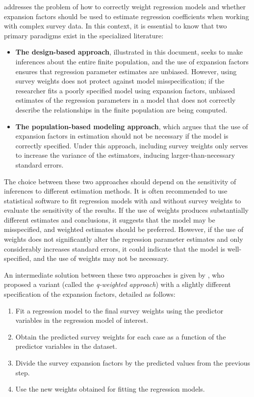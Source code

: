 \documentclass[
  12pt,
]{book}
\providecommand{\tightlist}{%
  \setlength{\itemsep}{0pt}\setlength{\parskip}{0pt}}
\begin{document}
\citet{Heeringa_West_Berglund_2017} addresses the problem of how to correctly weight regression models and whether expansion factors should be used to estimate regression coefficients when working with complex survey data. In this context, it is essential to know that two primary paradigms exist in the specialized literature:

\begin{itemize}
\tightlist
\item
  \textbf{The design-based approach}, illustrated in this document, seeks to make inferences about the entire finite population, and the use of expansion factors ensures that regression parameter estimates are unbiased. However, using survey weights does not protect against model misspecification; if the researcher fits a poorly specified model using expansion factors, unbiased estimates of the regression parameters in a model that does not correctly describe the relationships in the finite population are being computed.
\item
  \textbf{The population-based modeling approach}, which argues that the use of expansion factors in estimation should not be necessary if the model is correctly specified. Under this approach, including survey weights only serves to increase the variance of the estimators, inducing larger-than-necessary standard errors.
\end{itemize}

The choice between these two approaches should depend on the sensitivity of inferences to different estimation methods. It is often recommended to use statistical software to fit regression models with and without survey weights to evaluate the sensitivity of the results. If the use of weights produces substantially different estimates and conclusions, it suggests that the model may be misspecified, and weighted estimates should be preferred. However, if the use of weights does not significantly alter the regression parameter estimates and only considerably increases standard errors, it could indicate that the model is well-specified, and the use of weights may not be necessary.

An intermediate solution between these two approaches is given by \citet{pfeffermann2011modelling}, who proposed a variant (called the \emph{q-weighted approach}) with a slightly different specification of the expansion factors, detailed as follows:

\begin{enumerate}
\def\labelenumi{\arabic{enumi}.}
\tightlist
\item
  Fit a regression model to the final survey weights using the predictor variables in the regression model of interest.
\item
  Obtain the predicted survey weights for each case as a function of the predictor variables in the dataset.
\item
  Divide the survey expansion factors by the predicted values from the previous step.
\item
  Use the new weights obtained for fitting the regression models.
\end{enumerate}
\end{document}
